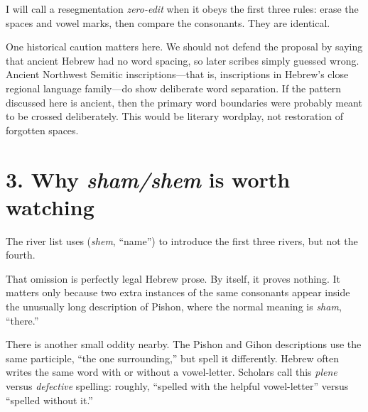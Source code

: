 I will call a resegmentation \emph{zero-edit} when it obeys the first three rules: erase the spaces and vowel marks, then compare the consonants. They are identical.

One historical caution matters here. We should not defend the proposal by saying that ancient Hebrew had no word spacing, so later scribes simply guessed wrong. Ancient Northwest Semitic inscriptions---that is, inscriptions in Hebrew's close regional language family---do show deliberate word separation.\cite{Millard1970,Tov2012} If the pattern discussed here is ancient, then the primary word boundaries were probably meant to be crossed deliberately. This would be literary wordplay, not restoration of forgotten spaces.

\section*{3. Why \textit{sham/shem} is worth watching}

The river list uses  (\textit{shem}, ``name'') to introduce the first three rivers, but not the fourth.


That omission is perfectly legal Hebrew prose. By itself, it proves nothing. It matters only because two extra instances of the same consonants appear inside the unusually long description of Pishon, where the normal meaning is \textit{sham}, ``there.''

There is another small oddity nearby. The Pishon and Gihon descriptions use the same participle, ``the one surrounding,'' but spell it differently. Hebrew often writes the same word with or without a vowel-letter. Scholars call this \emph{plene} versus \emph{defective} spelling: roughly, ``spelled with the helpful vowel-letter'' versus ``spelled without it.''


